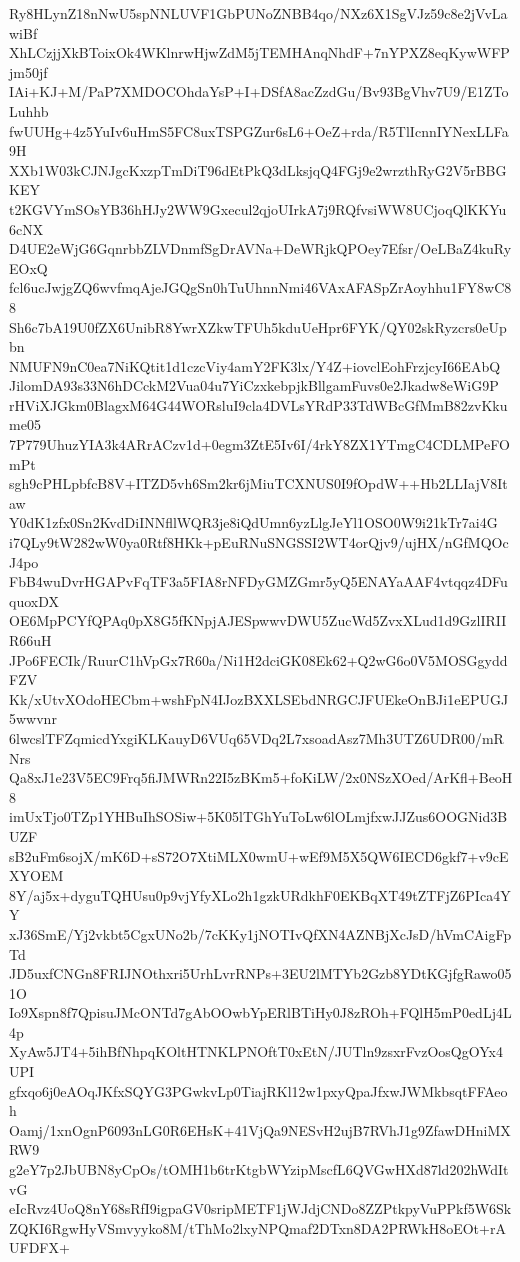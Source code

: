 Ry8HLynZ18nNwU5spNNLUVF1GbPUNoZNBB4qo/NXz6X1SgVJz59c8e2jVvLawiBf
XhLCzjjXkBToixOk4WKlnrwHjwZdM5jTEMHAnqNhdF+7nYPXZ8eqKywWFPjm50jf
IAi+KJ+M/PaP7XMDOCOhdaYsP+I+DSfA8acZzdGu/Bv93BgVhv7U9/E1ZToLuhhb
fwUUHg+4z5YuIv6uHmS5FC8uxTSPGZur6sL6+OeZ+rda/R5TlIcnnIYNexLLFa9H
XXb1W03kCJNJgcKxzpTmDiT96dEtPkQ3dLksjqQ4FGj9e2wrzthRyG2V5rBBGKEY
t2KGVYmSOsYB36hHJy2WW9Gxecul2qjoUIrkA7j9RQfvsiWW8UCjoqQlKKYu6cNX
D4UE2eWjG6GqnrbbZLVDnmfSgDrAVNa+DeWRjkQPOey7Efsr/OeLBaZ4kuRyEOxQ
fcl6ucJwjgZQ6wvfmqAjeJGQgSn0hTuUhnnNmi46VAxAFASpZrAoyhhu1FY8wC88
Sh6c7bA19U0fZX6UnibR8YwrXZkwTFUh5kduUeHpr6FYK/QY02skRyzcrs0eUpbn
NMUFN9nC0ea7NiKQtit1d1czcViy4amY2FK3lx/Y4Z+iovclEohFrzjcyI66EAbQ
JilomDA93s33N6hDCckM2Vua04u7YiCzxkebpjkBllgamFuvs0e2Jkadw8eWiG9P
rHViXJGkm0BlagxM64G44WORsluI9cla4DVLsYRdP33TdWBcGfMmB82zvKkume05
7P779UhuzYIA3k4ARrACzv1d+0egm3ZtE5Iv6I/4rkY8ZX1YTmgC4CDLMPeFOmPt
sgh9cPHLpbfcB8V+ITZD5vh6Sm2kr6jMiuTCXNUS0I9fOpdW++Hb2LLIajV8Itaw
Y0dK1zfx0Sn2KvdDiINNfllWQR3je8iQdUmn6yzLlgJeYl1OSO0W9i21kTr7ai4G
i7QLy9tW282wW0ya0Rtf8HKk+pEuRNuSNGSSI2WT4orQjv9/ujHX/nGfMQOcJ4po
FbB4wuDvrHGAPvFqTF3a5FIA8rNFDyGMZGmr5yQ5ENAYaAAF4vtqqz4DFuquoxDX
OE6MpPCYfQPAq0pX8G5fKNpjAJESpwwvDWU5ZucWd5ZvxXLud1d9GzlIRIIR66uH
JPo6FECIk/RuurC1hVpGx7R60a/Ni1H2dciGK08Ek62+Q2wG6o0V5MOSGgyddFZV
Kk/xUtvXOdoHECbm+wshFpN4IJozBXXLSEbdNRGCJFUEkeOnBJi1eEPUGJ5wwvnr
6lwcslTFZqmicdYxgiKLKauyD6VUq65VDq2L7xsoadAsz7Mh3UTZ6UDR00/mRNrs
Qa8xJ1e23V5EC9Frq5fiJMWRn22I5zBKm5+foKiLW/2x0NSzXOed/ArKfl+BeoH8
imUxTjo0TZp1YHBuIhSOSiw+5K05lTGhYuToLw6lOLmjfxwJJZus6OOGNid3BUZF
sB2uFm6sojX/mK6D+sS72O7XtiMLX0wmU+wEf9M5X5QW6IECD6gkf7+v9cEXYOEM
8Y/aj5x+dyguTQHUsu0p9vjYfyXLo2h1gzkURdkhF0EKBqXT49tZTFjZ6PIca4YY
xJ36SmE/Yj2vkbt5CgxUNo2b/7cKKy1jNOTIvQfXN4AZNBjXcJsD/hVmCAigFpTd
JD5uxfCNGn8FRIJNOthxri5UrhLvrRNPs+3EU2lMTYb2Gzb8YDtKGjfgRawo051O
Io9Xspn8f7QpisuJMcONTd7gAbOOwbYpERlBTiHy0J8zROh+FQlH5mP0edLj4L4p
XyAw5JT4+5ihBfNhpqKOltHTNKLPNOftT0xEtN/JUTln9zsxrFvzOosQgOYx4UPI
gfxqo6j0eAOqJKfxSQYG3PGwkvLp0TiajRKl12w1pxyQpaJfxwJWMkbsqtFFAeoh
Oamj/1xnOgnP6093nLG0R6EHsK+41VjQa9NESvH2ujB7RVhJ1g9ZfawDHniMXRW9
g2eY7p2JbUBN8yCpOs/tOMH1b6trKtgbWYzipMscfL6QVGwHXd87ld202hWdItvG
eIcRvz4UoQ8nY68sRfI9igpaGV0sripMETF1jWJdjCNDo8ZZPtkpyVuPPkf5W6Sk
ZQKI6RgwHyVSmvyyko8M/tThMo2lxyNPQmaf2DTxn8DA2PRWkH8oEOt+rAUFDFX+
